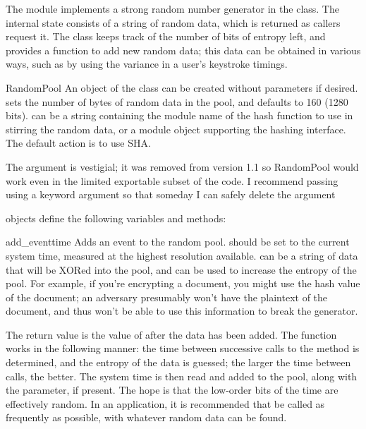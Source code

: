 \documentclass{howto}
\begin{document}
The  module implements a strong random number generator
in the  class.  The internal state consists of a string
of random data, which is returned as callers request it.  The class
keeps track of the number of bits of entropy left, and provides a function to
add new random data; this data can be obtained in various ways, such as
by using the variance in a user's keystroke timings.  

\begin{classdesc}{RandomPool}{ }
An object of the  class can be created without
parameters if desired.   sets the number of bytes of
random data in the pool, and defaults to 160 (1280 bits). 
can be a string containing the module name of the hash function to use
in stirring the random data, or a module object supporting the hashing
interface.  The default action is to use SHA.

The  argument is vestigial; it was removed from version
1.1 so RandomPool would work even in the limited exportable subset of
the code.  I recommend passing  using a keyword argument so
that someday I can safely delete the  argument

\end{classdesc}

 objects define the following variables and methods:

\begin{methoddesc}{add_event}{time}
Adds an event to the random pool.   should be set to the
current system time, measured at the highest resolution available.
 can be a string of data that will be XORed into the pool,
and can be used to increase the entropy of the pool.  For example, if
you're encrypting a document, you might use the hash value of the
document; an adversary presumably won't have the plaintext of the
document, and thus won't be able to use this information to break the
generator.
\end{methoddesc}

The return value is the value of  after the data has
been added.  The function works in the following manner: the time
between successive calls to the  method is determined,
and the entropy of the data is guessed; the larger the time between
calls, the better.  The system time is then read and added to the pool,
along with the  parameter, if present.  The hope is that the
low-order bits of the time are effectively random.  In an application,
it is recommended that  be called as frequently as
possible, with whatever random data can be found.
\end{document}
